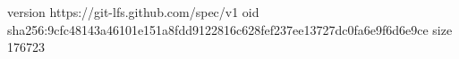 version https://git-lfs.github.com/spec/v1
oid sha256:9cfc48143a46101e151a8fdd9122816c628fef237ee13727dc0fa6e9f6d6e9ce
size 176723
